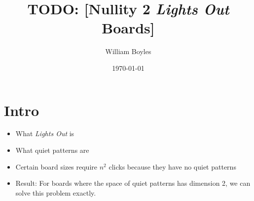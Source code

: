 \documentclass{article}
\begin{document}
	\title{TODO: [Nullity 2 \textit{Lights Out} Boards]}
	\author{William Boyles}
	\date{\today}
	\maketitle
	
	\section{Intro}
	\begin{itemize}
		\item What \textit{Lights Out} is
		\item What quiet patterns are
		\item Certain board sizes require $n^2$ clicks because they have no quiet patterns
		\item Result: For boards where the space of quiet patterns has dimension 2, we can solve this problem exactly.
	\end{itemize}
	
\end{document}
